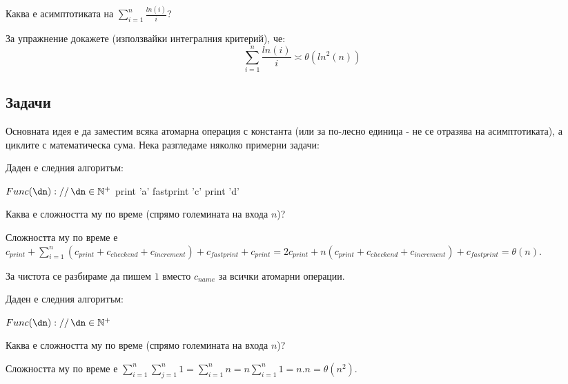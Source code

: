 \begin{application}
	Каква е асимптотиката на $\sum\limits_{i=1}^n\frac{ln(i)}{i}$?
\end{application}
\begin{solution}
	За упражнение докажете (използвайки интегралния критерий), че:
	\begin{equation*}
		\sum\limits_{i=1}^n\frac{ln(i)}{i}\asymp\theta(ln^2(n))
	\end{equation*}
\end{solution}\leavevmode\newline


\subsection{Задачи}

Основната идея е да заместим всяка атомарна операция с константа (или за по-лесно единица - не се отразява на асимптотиката), а циклите с математическа сума. Нека разгледаме няколко примерни задачи:\\

\begin{problem}
	Даден е следния алгоритъм:
	\begin{pseudocode}
		
		$Func(\dn)://\,\dn\in\mathbb{N}^+$
		\Mybegin
		{
			print 'a'\;
			fastprint 'c'\;
			print 'd'\;
		}
	\end{pseudocode}
	Каква е сложността му по време (спрямо големината на входа $n$)?
\end{problem}
\begin{solution}
	Сложността му по време е $c_{print}+\sum\limits_{i=1}^n(c_{print}+c_{checkend}+c_{increment})+c_{fastprint}+c_{print}=2c_{print}+n(c_{print}+c_{checkend}+c_{increment})+c_{fastprint}=\theta(n)$.
\end{solution}

\begin{remark*}
	За чистота се разбираме да пишем $1$ вместо $c_{name}$ за всички атомарни операции.
\end{remark*}\leavevmode\newline

\begin{problem}
	Даден е следния алгоритъм:
	\begin{pseudocode}
		\SetKwData{di}{i}
		\SetKwData{dj}{j}
		\SetKwData{dn}{n}
		
		$Func(\dn)://\,\dn\in\mathbb{N}^+$
		\Mybegin
		{
			\Myfor{$\di\leftarrow1$ \KwTo $\dn$}
			{
				\Myfor{$\dj\leftarrow1$ \KwTo $\dn$}{print 'a'\;}
			}
		}
	\end{pseudocode}
	Каква е сложността му по време (спрямо големината на входа $n$)?
\end{problem}
\begin{solution}
	Сложността му по време е $\sum\limits_{i=1}^n\sum\limits_{j=1}^n1=\sum\limits_{i=1}^n n=n\sum\limits_{i=1}^n 1=n.n=\theta(n^2)$.
\end{solution}\leavevmode\newline

